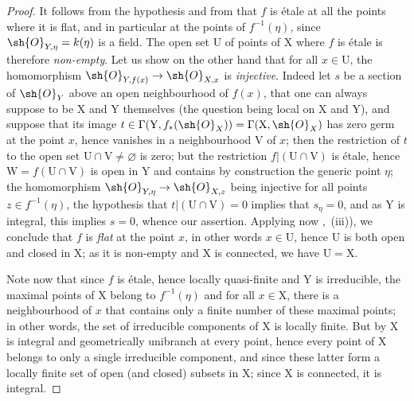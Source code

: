 \begin{proof}
It follows from the hypothesis and from  that $f$ is \'etale at all the points where it is flat, and in particular at the points of $f^{-1}(\eta)$, since $\sh{O}_{Y,\eta}=k(\eta)$ is a field.
The open set $\mathrm{U}$ of points of $\mathrm{X}$ where $f$ is \'etale is therefore \emph{non-empty}.
Let us show on the other hand that for all $x\in\mathrm{U}$, the homomorphism $\sh{O}_{Y,f(x)}\to\sh{O}_{X,x}$ is \emph{injective}.
Indeed let $s$ be a section of $\sh{O}_Y$ above an open neighbourhood of $f(x)$, that one can always suppose to be $\mathrm{X}$ and $\mathrm{Y}$ themselves (the question being local on $\mathrm{X}$ and $\mathrm{Y}$), and suppose that its image $t\in\Gamma(\mathrm{Y},f_*(\sh{O}_X))=\Gamma(\mathrm{X},\sh{O}_X)$ has zero germ at the point $x$, hence vanishes in a neighbourhood $\mathrm{V}$ of $x$; then the restriction of $t$ to the open set $\mathrm{U}\cap\mathrm{V}\neq\varnothing$ is zero; but the restriction $f|(\mathrm{U}\cap\mathrm{V})$ is \'etale, hence $\mathrm{W}=f(\mathrm{U}\cap\mathrm{V})$ is open in $\mathrm{Y}$ and contains by construction the generic point $\eta$; the homomorphism $\sh{O}_{Y,\eta}\to\sh{O}_{X,z}$ being injective for all points $z\in f^{-1}(\eta)$, the hypothesis that $t|(\mathrm{U}\cap\mathrm{V})=0$ implies that $s_\eta=0$, and as $\mathrm{Y}$ is integral, this implies $s=0$, whence our assertion.
Applying now ,~(iii)), we conclude that $f$ is \emph{flat} at the point $x$, in other words $x\in\mathrm{U}$, hence $\mathrm{U}$ is both open and closed in $\mathrm{X}$; as it is non-empty and $\mathrm{X}$ is connected, we have $\mathrm{U}=\mathrm{X}$.

Note now that since $f$ is \'etale, hence locally quasi-finite and $\mathrm{Y}$ is irreducible, the maximal points of $\mathrm{X}$ belong to $f^{-1}(\eta)$  and for all $x\in\mathrm{X}$, there is a neighbourhood of $x$ that contains only a finite number of these maximal points; in other words, the set of irreducible components of $\mathrm{X}$ is locally finite.
But by  $\mathrm{X}$ is integral and geometrically unibranch at every point, hence every point of $\mathrm{X}$ belongs to only a single irreducible component, and since these latter form a locally finite set of open (and closed) subsets in $\mathrm{X}$; since $\mathrm{X}$ is connected, it is integral.
\end{proof}

